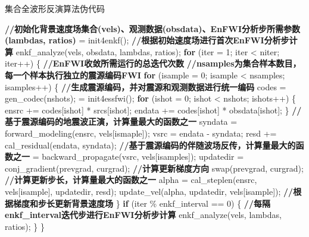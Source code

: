 \begin{algorithm}[ht]
\small
\caption{集合全波形反演算法伪代码}\label{alg:enfwicode}
\begin{algorithmic}[1]
\State \textbf{//初始化背景速度场集合(vels)、观测数据(obsdata)、EnFWI分析步所需参数(lambdas, ratios)}
 = init4enkf(); \label{ln:enfwiinit}
\State
\State \textbf{//根据初始速度场进行首次EnFWI分析步计算}
\State enkf\_analyze(vels, obsdata, lambdas, ratios); \label{ln:enfwi1enkf}
\State
\State \textbf{for} (iter = 1; iter < niter; iter++) \{ \textbf{//EnFWI收敛所需运行的总迭代次数} \label{ln:enfwiiter}
\State
\State \quad\quad \textbf{//nsamples为集合样本数目，每一个样本执行独立的震源编码FWI}
\State \quad\quad \textbf{for} (isample = 0; isample < nsamples; isamples++) \{ \label{ln:enfwisample}
\State \quad\quad\quad\quad \textbf{//生成震源编码，并对震源和观测数据进行统一编码}
\State \quad\quad\quad\quad codes = gen\_codec(nshots); \label{ln:enfwicodec}
\State \quad\quad\quad{} = init4essfwi();
\State \quad\quad\quad\quad \textbf{for} (ishot = 0; ishot < nshots; ishots++) \{
\State \quad\quad\quad\quad\quad\quad ensrc += codes[ishot] * srcs[ishot];
\State \quad\quad\quad\quad\quad\quad endata += codes[ishot] * obsdata[ishot];
\State \quad\quad\quad\quad \} \label{ln:enfwicodecend}
\State
\State \quad\quad\quad\quad \textbf{//基于震源编码的地震波正演，计算量最大的函数之一}
\State \quad\quad\quad\quad syndata = forward\_modeling(ensrc, vels[ismaple]); \label{ln:enfwiforward}
\State \quad\quad\quad\quad vsrc = endata - syndata; \label{ln:vsrc}
\State \quad\quad\quad\quad resd += cal\_residual(endata, syndata); \label{ln:resd}
\State
\State \quad\quad\quad\quad \textbf{//基于震源编码的伴随波场反传，计算量最大的函数之一}
\State \quad\quad\quad{} = backward\_propagate(vsrc, vels[isamples]); \label{ln:enfwibackward}
\State \quad\quad\quad\quad updatedir = conj\_gradient(prevgrad, curgrad); \textbf{//计算更新梯度方向}
\State \quad\quad\quad\quad swap(prevgrad, curgrad);
\State
\State \quad\quad\quad\quad \textbf{//计算更新步长，计算量最大的函数之一}
\State \quad\quad\quad\quad alpha = cal\_steplen(ensrc, vels[isample], updatedir, resd);
\State \quad\quad\quad\quad update\_vel(alpha, updatedir, vels[isample]); \textbf{//根据梯度和步长更新背景速度场} \label{ln:enfwibackwardend}
\State \quad\quad \} \label{ln:enfwisampleend}
\State
\State \quad\quad \textbf{if} (iter \% enkf\_interval == 0) \{ \textbf{//每隔enkf\_interval迭代步进行EnFWI分析步计算} \label{ln:enfwienkfbegin}
\State \quad\quad\quad\quad enkf\_analyze(vels, lambdas, ratios);
\State \quad\quad \} \label{ln:enfwienkfend}
\State \} \label{ln:enfwiiterend}
\end{algorithmic}
\end{algorithm}

